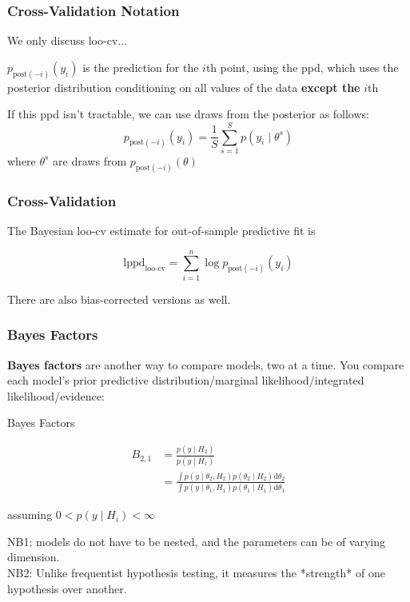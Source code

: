 \documentclass{beamer}
\begin{document}
\begin{frame}
\frametitle{Cross-Validation Notation}

We only discuss loo-cv...
\newline

$p_{\text{post}(-i)}(y_i)$ is the prediction for the $i$th point, using the ppd, which uses the posterior distribution conditioning on all values of the data {\bf except the} $i$th
\newline
\pause

If this ppd isn't tractable, we can use draws from the posterior as follows:
\[
p_{\text{post}(-i)}(y_i) = \frac{1}{S}\sum_{s=1}^S p(y_i \mid \theta^s)
\]
where $\theta^s$ are draws from $p_{\text{post}(-i)}(\theta)$
\newline

\end{frame}

\begin{frame}
\frametitle{Cross-Validation}


The Bayesian loo-cv estimate for out-of-sample predictive fit is 

\[
\text{lppd}_{\text{loo-cv}} = \sum_{i=1}^n \log p_{\text{post}(-i)}(y_i)
\]

There are also bias-corrected versions as well.

\end{frame}

\begin{frame}
\frametitle{Bayes Factors}

{\bf Bayes factors} are another way to compare models, two at a time. You compare each model's prior predictive distribution/marginal likelihood/integrated likelihood/evidence:
\begin{block}{Bayes Factors}

\begin{align*}
B_{2,1} &= \frac{p(y \mid H_2)}{p(y \mid H_1)}\\
&= \frac{\int p(y \mid \theta_2, H_2)p(\theta_2 \mid H_2) \text{d}\theta_2}{\int p(y \mid \theta_1, H_1)p(\theta_1 \mid H_1) \text{d}\theta_1}
\end{align*}

assuming $0 < p(y \mid H_i) < \infty$
\end{block}

NB1: models do not have to be nested, and the parameters can be of varying dimension. \\
NB2: Unlike frequentist hypothesis testing, it measures the *strength* of one hypothesis over another.

\end{frame}
\end{document}
